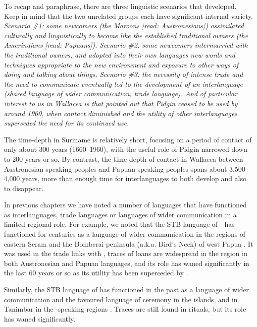To recap and paraphrase, there are three linguistic scenarios that developed.
Keep in mind that the two unrelated groups each have significant internal variety.
\it{Scenario {\#}1}: some newcomers (the Maroons [read: Austronesians])
assimilated culturally and linguistically to become like the established traditional
owners (the Amerindians [read: Papuans]).
\it{Scenario {\#}2}: some newcomers intermarried with the traditional
owners, and adopted into their own languages new words
and techniques appropriate to the new environment
and exposure to other ways of doing
and talking about things.
\it{Scenario {\#}3}: the necessity of intense trade
and the need to communicate eventually led to the development
of an interlanguage (shared language of wider communication, trade language).
And of particular interest to us in Wallacea is that \citet{HuttarVelantie1997}
pointed out that  Pidgin ceased to be used by around
1960, when contact diminished and the utility of other interlanguages
superseded the need for its continued use.

The time-depth in Suriname is relatively short,
focusing on a period of contact of only about 300 years (1660--1960),
with the useful role of  Pidgin narrowed down to 200 years or so.
By contrast, the time-depth of contact in Wallacea between Austronesian-speaking
peoples and Papuan-speaking peoples spans about 3,500--4,000 years,
more than enough time for interlanguages to both develop
and also to disappear.

In previous chapters we have noted a number of languages that
have functioned as interlanguages,
trade languages or languages of wider communication in a limited regional role.
For example, we noted that the STB language of - has
functioned for centuries as a language of wider communication
in the regions of eastern Seram
and the Bomberai peninsula (a.k.a.
Bird’s Neck) of west Papua
\citep{LoskiLoski1989,WalkerWalker1991}.
It was used in the trade links with ,
traces of  loans are widespread in the region in both Austronesian
and Papuan languages, and its role has waned significantly in
the last 60 years or so as its utility has been superceded by .

Similarly, the STB language of  has functioned in the
past as a language of wider communication
and the favoured language of ceremony in the  islands,
and in Tanimbar in the -speaking regions \citep{Hughes1987,McKinnon1991}.
Traces are still found in  rituals,
but its role has waned significantly.

